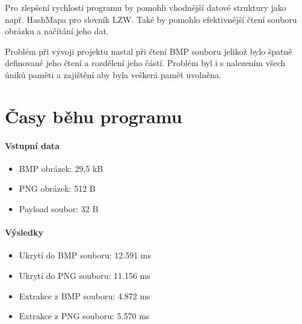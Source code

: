 \documentclass[12pt]{report}
\begin{document}
    Pro zlepšení rychlosti programu by pomohli vhodnější datové struktury jako např. HashMapa pro slovník LZW. Také by pomohlo efektivnější čtení souboru obrázku a načítání jeho dat.

    Problém při vývoji projektu nastal při čtení BMP souboru jelikož bylo špatně definované jeho čtení a rozdělení jeho částí. Problém byl i s nalezením všech úniků paměti a zajištění aby byla veškerá paměť uvolněna.


    \section{Časy běhu programu}

    \paragraph{Vstupní data}


    \begin{itemize}
        \item BMP obrázek: 29,5 kB
        \item PNG obrázek: 512 B
        \item Payload soubor: 32 B
    \end{itemize}

    \paragraph{Výsledky}
    \begin{itemize}
        \item Ukrytí do BMP souboru: 12.591 ms
        \item Ukrytí do PNG souboru: 11.156  ms
        \item Extrakce z BMP souboru: 4.872 ms
        \item Extrakce z PNG souboru: 5.570 ms
    \end{itemize}

    
    

    \listoffigures
\end{document}
